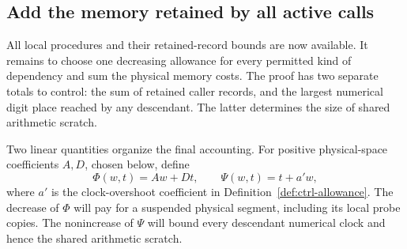 \subsection{Add the memory retained by all active calls}\label{sec:ctrl-space}

All local procedures and their retained-record bounds are now available. It remains to choose one decreasing allowance for every permitted kind of dependency and sum the physical memory costs. The proof has two separate totals to control: the sum of retained caller records, and the largest numerical digit place reached by any descendant. The latter determines the size of shared arithmetic scratch.

Two linear quantities organize the final accounting.  For positive
physical-space coefficients $A,D$, chosen below, define
\begin{equation}\label{eq:ctrl-potentials}
 \Phi(w,t)=Aw+Dt,\qquad \Psi(w,t)=t+a'w,
\end{equation}
where $a'$ is the clock-overshoot coefficient in
Definition~\ref{def:ctrl-allowance}.  The decrease of $\Phi$ will pay for
a suspended physical segment, including its local probe copies.
The nonincrease of $\Psi$ will bound every descendant numerical clock
and hence the shared arithmetic scratch.



